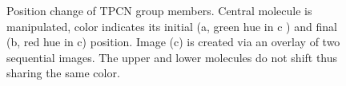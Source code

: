 \begin{figure}
	\centering
	\caption{Position change of TPCN group members. Central molecule is manipulated, color indicates its initial (a, green hue in c ) and final (b, red hue in c) position. Image (c) is created via an overlay of two sequential images. The upper and lower molecules do not shift thus sharing the same color.}
	\label{fig:TPCN-manipulation}
\end{figure}

